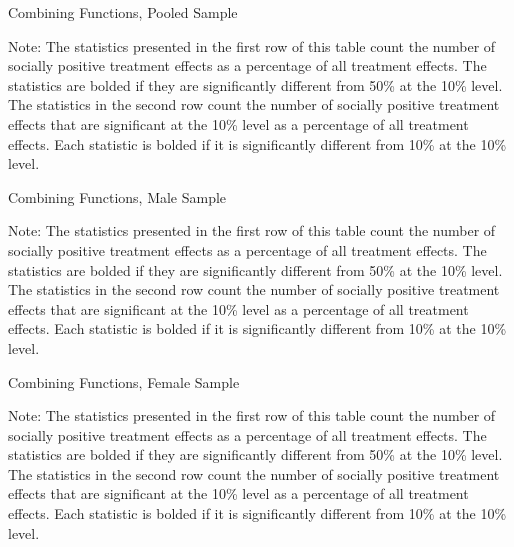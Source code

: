 	\begin{table}[H]
	\begin{threeparttable}
     \caption{Combining Functions, Pooled Sample}
     \label{table:abccare_rslt_pooled_counts_all}
	
	\begin{tablenotes}
	\footnotesize
	 Note: The statistics presented in the first row of this table count the number of socially positive
	treatment effects as a percentage of all treatment effects. The statistics are bolded if they are
	significantly different from 50\% at the 10\% level. The statistics in the second row count the
	number of socially positive treatment effects that are significant at the 10\% level as a percentage
	of all treatment effects. Each statistic is bolded if it is significantly different from 10\% at the 10\%
	level.
	\end{tablenotes}
	\end{threeparttable}
	\end{table}

	\begin{table}[H]
	\begin{threeparttable}
     \caption{Combining Functions, Male Sample}
     \label{table:abccare_rslt_male_counts_all}
	
	\begin{tablenotes}
	\footnotesize
	 Note: The statistics presented in the first row of this table count the number of socially positive
	treatment effects as a percentage of all treatment effects. The statistics are bolded if they are
	significantly different from 50\% at the 10\% level. The statistics in the second row count the
	number of socially positive treatment effects that are significant at the 10\% level as a percentage
	of all treatment effects. Each statistic is bolded if it is significantly different from 10\% at the 10\%
	level.
	\end{tablenotes}
	\end{threeparttable}
	\end{table}

	\begin{table}[H]
	\begin{threeparttable}
     \caption{Combining Functions, Female Sample}
     \label{table:abccare_rslt_female_counts_all}
	
	\begin{tablenotes}
	\footnotesize
	 Note: The statistics presented in the first row of this table count the number of socially positive
	treatment effects as a percentage of all treatment effects. The statistics are bolded if they are
	significantly different from 50\% at the 10\% level. The statistics in the second row count the
	number of socially positive treatment effects that are significant at the 10\% level as a percentage
	of all treatment effects. Each statistic is bolded if it is significantly different from 10\% at the 10\%
	level.
	\end{tablenotes}
	\end{threeparttable}
	\end{table}


